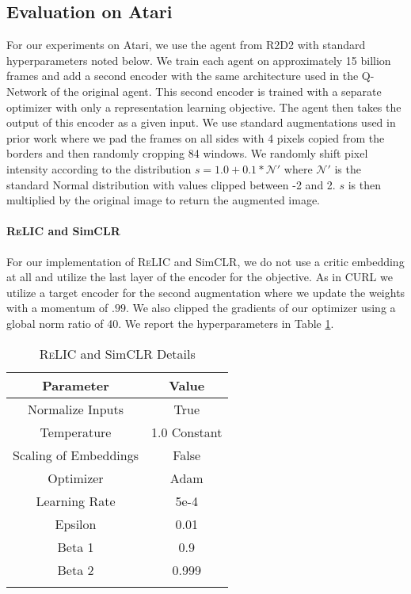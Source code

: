 \documentclass{article}
\newcommand{\relic}{\textsc{ReLIC}}
\begin{document}
\subsection{Evaluation on Atari} \label{sec:atari_app}
For our experiments on Atari, we use the agent from R2D2 \citep{kapturowski2019} with standard hyperparameters noted below. We train each agent on approximately 15 billion frames and add a second encoder with the same architecture used in the Q-Network of the original agent. This second encoder is trained with a separate optimizer with only a representation learning objective. The agent then takes the output of this encoder as a given input. We use standard augmentations used in prior work \citep{kostrikov2020image} where we pad the frames on all sides with 4 pixels copied from the borders and then randomly cropping 84 windows. We randomly shift pixel intensity according to the distribution $s = 1.0 + 0.1 * \mathcal{N}'$ where $\mathcal{N}'$ is the standard Normal distribution with values clipped between -2 and 2. $s$ is then multiplied by the original image to return the augmented image.

\paragraph{\relic{} and SimCLR}
For our implementation of \relic{} and SimCLR, we do not use a critic embedding at all and utilize the last layer of the encoder for the objective. As in CURL \citep{srinivas2020curl} we utilize a target encoder for the second augmentation where we update the weights with a momentum of $.99$. We also clipped the gradients of our optimizer using a global norm ratio of 40. We report the hyperparameters in Table \ref{relic_atari}.


\begin{table}[ht]
  \caption{\relic{} and SimCLR Details}
  \centering
   \vspace{0.2cm}
  \begin{tabular}{cc}
    \toprule
    Parameter     & Value \\
    \midrule
    Normalize Inputs & True \\
    Temperature & 1.0 Constant \\
    Scaling of Embeddings & False \\
    Optimizer & Adam \\
    Learning Rate & 5e-4 \\
    Epsilon & 0.01 \\
    Beta 1 & 0.9 \\
    Beta 2 & 0.999 \\
    \bottomrule
    \label{relic_atari}
  \end{tabular}
\end{table}
\end{document}
